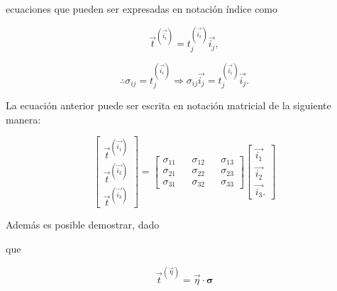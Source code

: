 \documentclass{article}
\begin{document}
    ecuaciones que pueden ser expresadas en notaci\'{o}n \'{i}ndice como

    \begin{equation}
        \vec{t}^{(\vec{i_{i}})} = t_{j}^{(\vec{i_{i}})}\vec{i_{j}},
    \end{equation}

    \begin{equation}
        \therefore \sigma_{ij} = t_{j}^{(\vec{i_{i}})} \Longrightarrow 
        \sigma_{ij}\vec{i_{j}} = t_{j}^{(\vec{i_{i}})}\vec{i_{j}}.
    \end{equation}

    La ecuaci\'{o}n anterior puede ser escrita en notaci\'{o}n matricial de la siguiente manera:

    \begin{equation}
        \begin{bmatrix}
            \vec{t}^{(\vec{i_{1}})} \\
            \vec{t}^{(\vec{i_{2}})} \\
            \vec{t}^{(\vec{i_{3}})}
        \end{bmatrix}
        =
        \begin{bmatrix}
            \sigma_{11} && \sigma_{12} && \sigma_{13} \\
            \sigma_{21} && \sigma_{22} && \sigma_{23} \\
            \sigma_{31} && \sigma_{32} && \sigma_{33}
        \end{bmatrix}
        \begin{bmatrix}
            \vec{i_{1}} \\
            \vec{i_{2}} \\
            \vec{i_{3}}.
        \end{bmatrix}
    \end{equation}

    Adem\'{a}s es posible demostrar, dado


    que

    \begin{equation}
        \vec{t}^{(\vec{\eta})} = \vec{\eta}\cdot\bm{\sigma}
    \end{equation}

\end{document}
